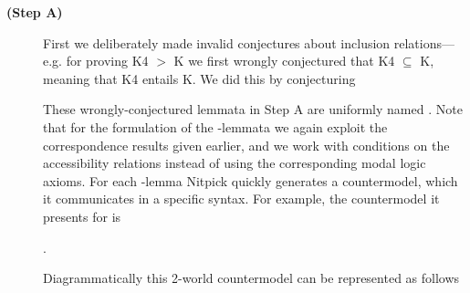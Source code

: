 \begin{isabellebody}
\begin{isamarkuptext}
\begin{description}
\item[\textbf{(Step A)}] First we deliberately made invalid conjectures about inclusion relations---e.g. for proving 
K4 $>$ K we first wrongly conjectured that K4 $\subseteq$ K, meaning that K4 entails K. 
We did this by conjecturing 
\begin{center}  \end{center}
These wrongly-conjectured lemmata in Step A are uniformly named .
Note that for the formulation of the -lemmata we again exploit the correspondence results given earlier, 
and we work with conditions on the accessibility relations instead of using the corresponding modal logic axioms.
For each -lemma Nitpick quickly generates a countermodel, which 
it communicates in a specific syntax. For example, the countermodel it presents for  is 
\begin{center}
.
\end{center}
Diagrammatically this 2-world countermodel can be represented as follows 
\begin{center}
\end{center}


\end{description}
\end{isamarkuptext}
\end{isabellebody}
